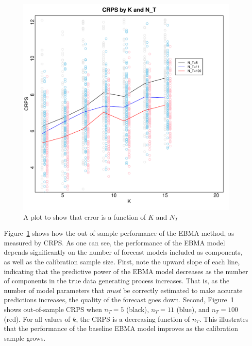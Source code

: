 \documentclass[12pt,fullpage,endnotes]{article}
\begin{document}
\begin{figure}[ht]
\caption{A plot to show that error is a function of $K$ and $N_T$}
\label{simplot1}
\centering
\includegraphics[scale=.8]{SimTemp1}
\end{figure}

Figure~\ref{simplot1} shows how the out-of-sample performance of the
EBMA method, as measured by CRPS. As one can see, the performance of the EBMA model depends significantly on the number of forecast models included as components, as well as the calibration sample size. First, note the upward slope of each line, indicating that the
predictive power of the EBMA model decreases as the number of components in
the true data generating process increases. That is, as the number of
model parameters that \textit{must} be correctly estimated to make
accurate predictions increases, the quality of the forecast goes down.
Second, Figure~\ref{simplot1} shows out-of-sample CRPS when $n_T=5$
(black), $n_T=11$ (blue), and $n_T=100$ (red).  For all values of $k$,
the CRPS is a decreasing function of $n_T$.  This illustrates that the
performance of the baseline EBMA model improves as the calibration
sample grows.
\end{document}
